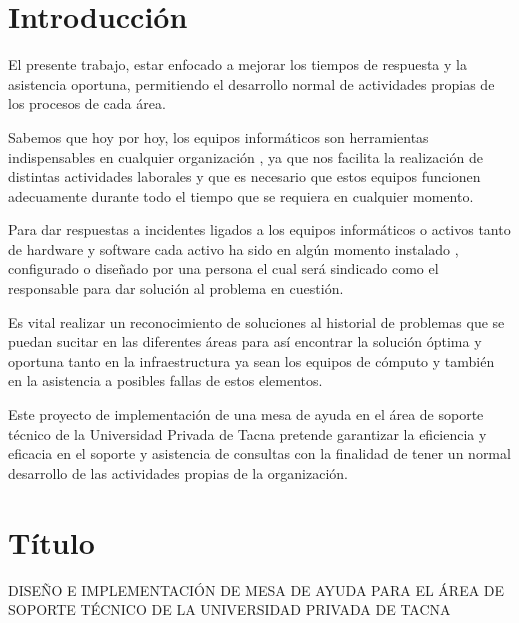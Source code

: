 \documentclass[preprint,12pt]{elsarticle}
\begin{document}

\section{Introducción} 

El presente trabajo, estar enfocado a mejorar los tiempos de respuesta y la asistencia oportuna, permitiendo el desarrollo normal de actividades propias de los procesos de cada área.

Sabemos que hoy por hoy,  los equipos informáticos son herramientas indispensables en cualquier organización , ya que nos facilita la realización de distintas actividades laborales y que es necesario que estos equipos funcionen adecuamente durante todo el tiempo que se requiera en cualquier momento.

Para dar respuestas a incidentes ligados a los equipos informáticos o activos tanto de hardware y software cada activo ha sido en algún momento instalado , configurado o diseñado por una persona el cual será sindicado como el responsable para dar solución al problema en cuestión.

Es vital realizar un reconocimiento de soluciones al historial de problemas que se puedan sucitar en las diferentes áreas  para así encontrar la solución óptima y oportuna tanto en la infraestructura ya sean los equipos de cómputo y también en la asistencia a posibles fallas de estos elementos.

Este proyecto de implementación de una mesa de ayuda en el área de soporte técnico de la Universidad Privada de Tacna pretende garantizar la eficiencia y eficacia en el soporte y asistencia de consultas con la finalidad de  tener un  normal desarrollo de las actividades propias de la organización.




\section{Título}

DISEÑO E IMPLEMENTACIÓN DE MESA DE AYUDA PARA EL ÁREA DE SOPORTE TÉCNICO DE LA UNIVERSIDAD PRIVADA DE TACNA
\end{document}
